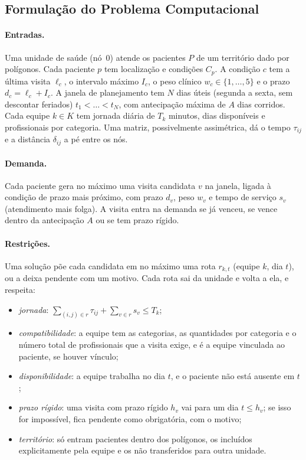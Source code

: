 \documentclass[11pt,a4paper]{article}
\begin{document}
\subsection{Formulação do Problema Computacional}

\paragraph{Entradas.} Uma unidade de saúde (nó~0) atende os pacientes $P$ de um território dado por polígonos. Cada paciente $p$ tem localização e condições $C_p$. A condição $c$ tem a última visita $\ell_c$, o intervalo máximo $I_c$, o peso clínico $w_c \in \{1,\dots,5\}$ e o prazo $d_c = \ell_c + I_c$. A janela de planejamento tem $N$ dias úteis (segunda a sexta, sem descontar feriados) $t_1 < \dots < t_N$, com antecipação máxima de $A$ dias corridos. Cada equipe $k \in K$ tem jornada diária de $T_k$ minutos, dias disponíveis e profissionais por categoria. Uma matriz, possivelmente assimétrica, dá o tempo $\tau_{ij}$ e a distância $\delta_{ij}$ a pé entre os nós.

\paragraph{Demanda.} Cada paciente gera no máximo uma visita candidata $v$ na janela, ligada à condição de prazo mais próximo, com prazo $d_v$, peso $w_v$ e tempo de serviço $s_v$ (atendimento mais folga). A visita entra na demanda se já venceu, se vence dentro da antecipação $A$ ou se tem prazo rígido.

\paragraph{Restrições.} Uma solução põe cada candidata em no máximo uma rota $r_{k,t}$ (equipe $k$, dia $t$), ou a deixa pendente com um motivo. Cada rota sai da unidade e volta a ela, e respeita:
\begin{itemize}
    \item \emph{jornada}: $\sum_{(i,j)\in r} \tau_{ij} + \sum_{v\in r} s_v \le T_k$;
    \item \emph{compatibilidade}: a equipe tem as categorias, as quantidades por categoria e o número total de profissionais que a visita exige, e é a equipe vinculada ao paciente, se houver vínculo;
    \item \emph{disponibilidade}: a equipe trabalha no dia $t$, e o paciente não está ausente em $t$;
    \item \emph{prazo rígido}: uma visita com prazo rígido $h_v$ vai para um dia $t \le h_v$; se isso for impossível, fica pendente como obrigatória, com o motivo;
    \item \emph{território}: só entram pacientes dentro dos polígonos, os incluídos explicitamente pela equipe e os não transferidos para outra unidade.
\end{itemize}
\end{document}
